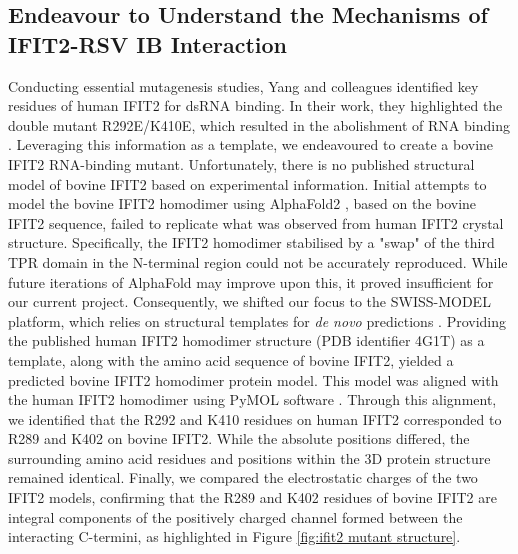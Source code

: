 \subsection{Endeavour to Understand the Mechanisms of IFIT2-RSV IB Interaction} \label{subsec:Endeavour in Understanding the Mechanisms of IFIT2-RSV IB Interaction}
Conducting essential mutagenesis studies, Yang and colleagues identified key residues of human IFIT2 for dsRNA binding. In their work, they highlighted the double mutant R292E/K410E, which resulted in the abolishment of RNA binding \cite{Yang2012CrystalMechanisms}. Leveraging this information as a template, we endeavoured to create a bovine IFIT2 RNA-binding mutant. Unfortunately, there is no published structural model of bovine IFIT2 based on experimental information. Initial attempts to model the bovine IFIT2 homodimer using AlphaFold2 \cite{Jumper2021HighlyAlphaFold}, based on the bovine IFIT2 sequence, failed to replicate what was observed from human IFIT2 crystal structure. Specifically, the IFIT2 homodimer stabilised by a "swap" of the third TPR domain in the N-terminal region could not be accurately reproduced. While future iterations of AlphaFold may improve upon this, it proved insufficient for our current project. Consequently, we shifted our focus to the SWISS-MODEL platform, which relies on structural templates for \textit{de novo} predictions \cite{Waterhouse2018SWISS-MODEL:Complexes}. Providing the published human IFIT2 homodimer structure (PDB identifier 4G1T) as a template, along with the amino acid sequence of bovine IFIT2, yielded a predicted bovine IFIT2 homodimer protein model. This model was aligned with the human IFIT2 homodimer using PyMOL software \cite{SchrodingerTeam2023TheSystem}. Through this alignment, we identified that the R292 and K410 residues on human IFIT2 corresponded to R289 and K402 on bovine IFIT2. While the absolute positions differed, the surrounding amino acid residues and positions within the 3D protein structure remained identical. Finally, we compared the electrostatic charges of the two IFIT2 models, confirming that the R289 and K402 residues of bovine IFIT2 are integral components of the positively charged channel formed between the interacting C-termini, as highlighted in Figure \ref{fig:ifit2 mutant structure}.

